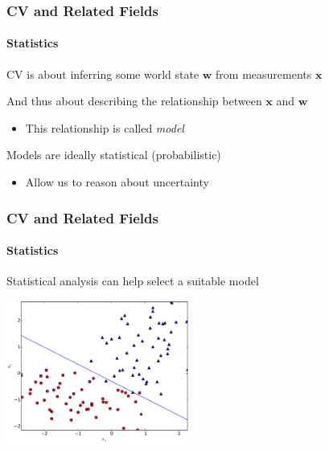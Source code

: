 \documentclass[xetex,professionalfont]{beamer}
\renewcommand{\vec}[1]{\ensuremath{\mathbf{#1}}}
\newcommand{\vw}{\vec{w}}
\newcommand{\vx}{\vec{x}}
\begin{document}

\begin{frame}
\frametitle{CV and Related Fields}
\framesubtitle{Statistics}

CV is about inferring some world state $\vw$ from measurements $\vx$

\bigskip
And thus about describing the relationship between $\vx$ and $\vw$
\begin{itemize}
    \item This relationship is called \emph{model}
\end{itemize}

\bigskip
Models are ideally statistical (probabilistic)
\begin{itemize}
    \item Allow us to reason about uncertainty
\end{itemize}

\end{frame}


\begin{frame}
\frametitle{CV and Related Fields}
\framesubtitle{Statistics}

Statistical analysis can help select a suitable model %

\bigskip
\begin{center}
\includegraphics[width=6cm]{figures/perceptron-classification.pdf} %
\end{center}

\end{frame}

\end{document}
